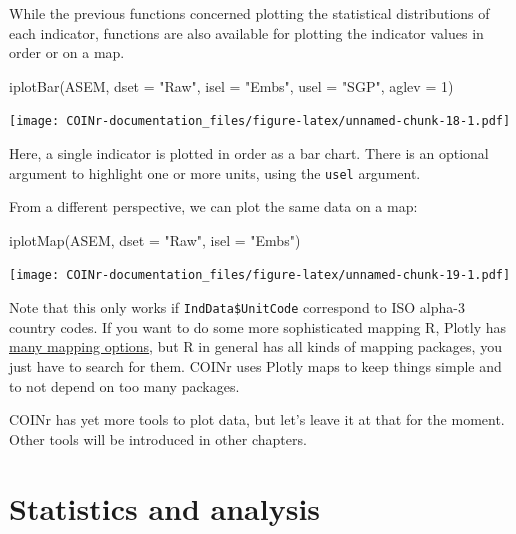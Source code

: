 \documentclass[
]{book}
\newenvironment{Shaded}{\begin{snugshade}}{\end{snugshade}}
\newcommand{\AttributeTok}[1]{\textcolor[rgb]{0.77,0.63,0.00}{#1}}
\newcommand{\DecValTok}[1]{\textcolor[rgb]{0.00,0.00,0.81}{#1}}
\newcommand{\FunctionTok}[1]{\textcolor[rgb]{0.00,0.00,0.00}{#1}}
\newcommand{\NormalTok}[1]{#1}
\newcommand{\StringTok}[1]{\textcolor[rgb]{0.31,0.60,0.02}{#1}}
\begin{document}
While the previous functions concerned plotting the statistical distributions of each indicator, functions are also available for plotting the indicator values in order or on a map.

\begin{Shaded}
\begin{Highlighting}[]
\FunctionTok{iplotBar}\NormalTok{(ASEM, }\AttributeTok{dset =} \StringTok{"Raw"}\NormalTok{, }\AttributeTok{isel =} \StringTok{"Embs"}\NormalTok{, }\AttributeTok{usel =} \StringTok{"SGP"}\NormalTok{, }\AttributeTok{aglev =} \DecValTok{1}\NormalTok{)}
\end{Highlighting}
\end{Shaded}

\texttt{[image: COINr-documentation\_files/figure-latex/unnamed-chunk-18-1.pdf]}

Here, a single indicator is plotted in order as a bar chart. There is an optional argument to highlight one or more units, using the \texttt{usel} argument.

From a different perspective, we can plot the same data on a map:

\begin{Shaded}
\begin{Highlighting}[]
\FunctionTok{iplotMap}\NormalTok{(ASEM, }\AttributeTok{dset =} \StringTok{"Raw"}\NormalTok{, }\AttributeTok{isel =} \StringTok{"Embs"}\NormalTok{)}
\end{Highlighting}
\end{Shaded}

\texttt{[image: COINr-documentation\_files/figure-latex/unnamed-chunk-19-1.pdf]}

Note that this only works if \texttt{IndData\$UnitCode} correspond to ISO alpha-3 country codes. If you want to do some more sophisticated mapping R, Plotly has \href{https://plotly.com/r/maps/}{many mapping options}, but R in general has all kinds of mapping packages, you just have to search for them. COINr uses Plotly maps to keep things simple and to not depend on too many packages.

COINr has yet more tools to plot data, but let's leave it at that for the moment. Other tools will be introduced in other chapters.

\hypertarget{statistics-and-analysis}{%
\section{Statistics and analysis}\label{statistics-and-analysis}}
\end{document}
